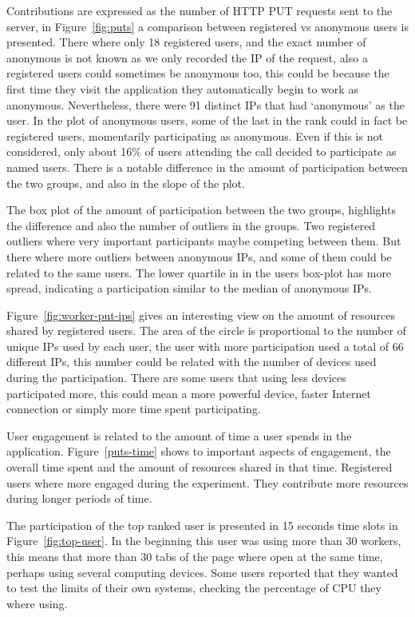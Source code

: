 \documentclass{llncs}
\begin{document}
Contributions are expressed as the number of HTTP PUT requests sent to the server, 
in Figure~\ref{fig:puts} a comparison between registered vs anonymous users is 
presented. There where only 18 registered users, and the exact number of anonymous
is not known as we only recorded the IP of the request, also a registered users 
could sometimes be anonymous too, this could be because the first time they visit
the application they automatically begin to work as anonymous. Nevertheless,
there were 91 distinct IPs that had `anonymous' as the user. In the plot of
anonymous users, some of the last in the rank could in fact be registered users, 
momentarily participating as anonymous. Even if this is not considered, only 
about 16\% of users attending the call decided to participate as named users. 
There is a notable difference in the amount of participation between the two
groups, and also in the slope of the plot.

The box plot of the amount of participation between the two groups, highlights
the difference and also the number of outliers in the groups. Two registered 
outliers where very important participants maybe competing between them. But
there where more outliers between anonymous IPs, and some of them could be related
to the same users. The lower quartile in in the users box-plot has more
spread, indicating a participation similar to the median of anonymous IPs.

Figure~\ref{fig:worker-put-ips} gives an interesting view on the amount of
resources shared by registered users. The area of the circle is proportional
to the number of unique IPs used by each user, the user with more participation
used a total of 66 different IPs, this number could be related with the number
of devices used during the participation. There are some users that using less
devices participated more, this could mean a more powerful device, faster 
Internet connection or simply more time spent participating.

User engagement is related to the amount of time a user spends in the 
application. Figure~\ref{puts-time} shows to important aspects of
engagement, the overall time spent and the amount of resources shared
in that time. Registered users where more engaged during the experiment.
They contribute more resources during longer periods of time.

The participation of the top ranked user is presented in 15 seconds time slots in
Figure~\ref{fig:top-user}. In the beginning this user was using more than 30
workers, this means that more than 30 tabs of the page where open at the
same time, perhaps using several computing devices. Some users reported that 
they wanted to test the limits of their own systems, checking the percentage of
CPU they where using. 






\end{document}
